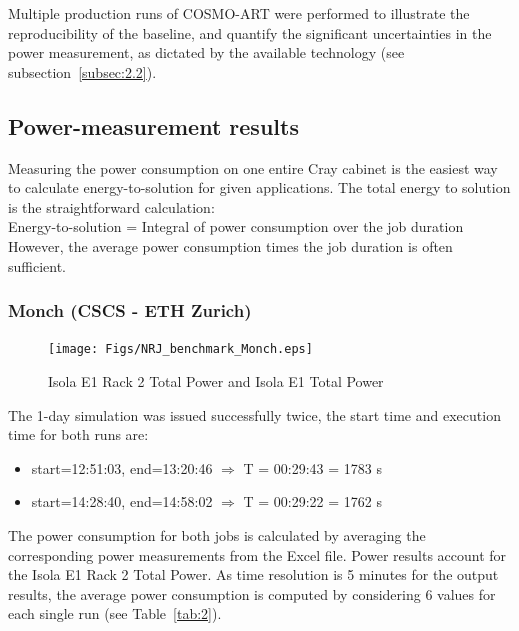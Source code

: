 Multiple production runs of COSMO-ART were performed to illustrate the
reproducibility  of   the  baseline,  and   quantify  the  significant
uncertainties in  the power measurement, as dictated  by the available
technology (see subsection~\ref{subsec:2.2}).

\subsection{Power-measurement results}
\label{subsec:3.3}
Measuring  the power  consumption on  one entire  Cray cabinet  is the
easiest    way    to    calculate   energy-to-solution    for    given
applications.  The total  energy  to solution  is the  straightforward
calculation:\\

Energy-to-solution  =  Integral  of  power consumption  over  the  job
duration\\

However, the average power consumption times the job duration is often
sufficient.

\subsubsection{Monch (CSCS - ETH Zurich)}
\begin{figure}[htbf]
  \texttt{[image: Figs/NRJ\_benchmark\_Monch.eps]}
  \caption{Isola E1 Rack 2 Total Power and Isola E1 Total Power}
  \label{fig:1}
\end{figure}

The 1-day simulation was issued successfully twice, the start time and
execution time for both runs are:
\begin{itemize}
\item start=12:51:03, end=13:20:46 $\Rightarrow$ T = 00:29:43 = 1783 s
\item start=14:28:40, end=14:58:02 $\Rightarrow$ T = 00:29:22 = 1762 s
\end{itemize}

The power  consumption for  both jobs is  calculated by  averaging the
corresponding power  measurements from the Excel  file.  Power results
account for the  Isola E1 Rack 2 Total Power. As  time resolution is 5
minutes  for the  output  results, the  average  power consumption  is
computed   by  considering  6   values  for   each  single   run  (see
Table~\ref{tab:2}).

